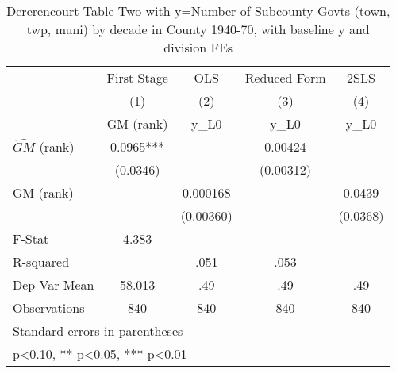 \begin{table}[htbp]\centering
\def\sym#1{\ifmmode^{#1}\else\(^{#1}\)\fi}
\caption{Dererencourt Table Two with y=Number of Subcounty Govts (town, twp, muni) by decade in County 1940-70, with baseline y and division FEs}
\begin{tabular}{l*{4}{c}}
\toprule
                    & First Stage   &         OLS   &Reduced Form   &        2SLS   \\
                    &\multicolumn{1}{c}{(1)}&\multicolumn{1}{c}{(2)}&\multicolumn{1}{c}{(3)}&\multicolumn{1}{c}{(4)}\\
                    &\multicolumn{1}{c}{GM  (rank)}&\multicolumn{1}{c}{y\_L0}&\multicolumn{1}{c}{y\_L0}&\multicolumn{1}{c}{y\_L0}\\
\midrule
$\hat{GM}$ (rank)   &      0.0965***&               &     0.00424   &               \\
                    &    (0.0346)   &               &   (0.00312)   &               \\
\addlinespace
GM  (rank)          &               &    0.000168   &               &      0.0439   \\
                    &               &   (0.00360)   &               &    (0.0368)   \\
\midrule
F-Stat              &       4.383   &               &               &               \\
R-squared           &               &        .051   &        .053   &               \\
Dep Var Mean        &      58.013   &         .49   &         .49   &         .49   \\
Observations        &         840   &         840   &         840   &         840   \\
\bottomrule
\multicolumn{5}{l}{\footnotesize Standard errors in parentheses}\\
\multicolumn{5}{l}{\footnotesize * p<0.10, ** p<0.05, *** p<0.01}\\
\end{tabular}
\end{table}
